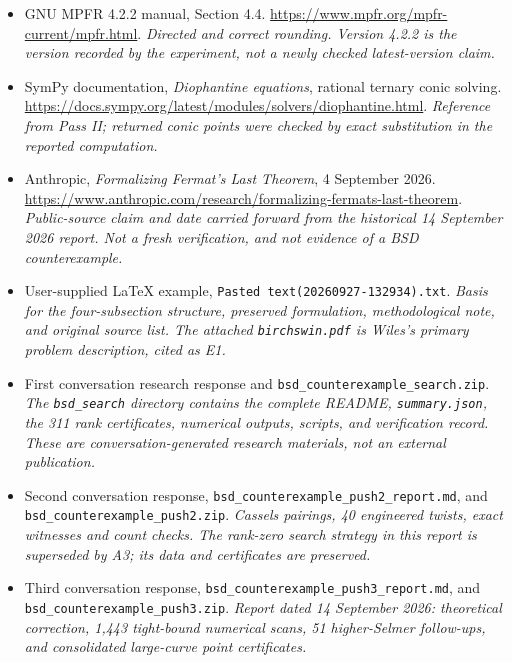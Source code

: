 \documentclass[11pt]{article}
\begin{document}
\begin{itemize}
\item[E10]\hypertarget{source:E10}{}GNU MPFR 4.2.2 manual, Section 4.4.
\url{https://www.mpfr.org/mpfr-current/mpfr.html}.
\textit{Directed and correct rounding. Version 4.2.2 is the version recorded by
the experiment, not a newly checked latest-version claim.}

\item[E11]\hypertarget{source:E11}{}SymPy documentation,
\emph{Diophantine equations}, rational ternary conic solving.
\url{https://docs.sympy.org/latest/modules/solvers/diophantine.html}.
\textit{Reference from Pass II; returned conic points were checked by exact
substitution in the reported computation.}

\item[E12]\hypertarget{source:E12}{}Anthropic,
\emph{Formalizing Fermat's Last Theorem}, 4 September 2026.
\url{https://www.anthropic.com/research/formalizing-fermats-last-theorem}.
\textit{Public-source claim and date carried forward from the historical
14 September 2026 report. Not a fresh verification, and not evidence of a BSD
counterexample.}

\item[A0]\hypertarget{source:A0}{}User-supplied LaTeX example,
\nolinkurl{Pasted text(20260927-132934).txt}.
\textit{Basis for the four-subsection structure, preserved formulation,
methodological note, and original source list. The attached
\nolinkurl{birchswin.pdf} is Wiles's primary problem description, cited as E1.}

\item[A1]\hypertarget{source:A1}{}First conversation research response and
\nolinkurl{bsd_counterexample_search.zip}.
\textit{The \nolinkurl{bsd_search} directory contains the complete README,
\nolinkurl{summary.json}, the 311 rank certificates, numerical outputs, scripts,
and verification record. These are conversation-generated research materials,
not an external publication.}

\item[A2]\hypertarget{source:A2}{}Second conversation response,
\nolinkurl{bsd_counterexample_push2_report.md}, and
\nolinkurl{bsd_counterexample_push2.zip}.
\textit{Cassels pairings, 40 engineered twists, exact witnesses and count checks.
The rank-zero search strategy in this report is superseded by A3; its data and
certificates are preserved.}

\item[A3]\hypertarget{source:A3}{}Third conversation response,
\nolinkurl{bsd_counterexample_push3_report.md}, and
\nolinkurl{bsd_counterexample_push3.zip}.
\textit{Report dated 14 September 2026: theoretical correction, 1,443 tight-bound
numerical scans, 51 higher-Selmer follow-ups, and consolidated large-curve
point certificates.}


\end{itemize}
\end{document}

